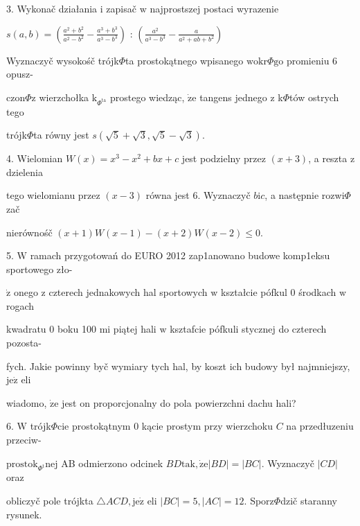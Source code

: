 \documentclass[a4paper,12pt]{article}
\begin{document}
3. Wykonač działania $\mathrm{i}$ zapisač $\mathrm{w}$ najprostszej postaci wyrazenie

$s(a,b)= (\displaystyle \frac{a^{2}+b^{2}}{a^{2}-b^{2}}-\frac{a^{3}+b^{3}}{a^{3}-b^{3}})$ : $(\displaystyle \frac{a^{2}}{a^{3}-b^{3}}-\frac{a}{a^{2}+ab+b^{2}})$

Wyznaczyč wysokośč trójk$\Phi$ta prostokątnego wpisanego $\mathrm{w}\mathrm{o}\mathrm{k}\mathrm{r}\Phi \mathrm{g}\mathrm{o}$ promieniu 6 opusz-

$\mathrm{c}\mathrm{z}\mathrm{o}\mathrm{n}\Phi \mathrm{z}$ wierzchołka $\mathrm{k}_{\Phi^{\mathrm{t}\mathrm{a}}}$ prostego wiedząc, $\dot{\mathrm{z}}\mathrm{e}$ tangens jednego $\mathrm{z}$ k$\Phi$tów ostrych tego

trójk$\Phi$ta równy jest $s(\sqrt{5}+\sqrt{3},\sqrt{5}-\sqrt{3}).$

4. Wielomian $W(x) =x^{3}-x^{2}+bx+c$ jest podzielny przez $(x+3)$, a reszta $\mathrm{z}$ dzielenia

tego wielomianu przez $(x-3)$ równa jest 6. Wyznaczyč $b\mathrm{i} c$, a następnie rozwi$\Phi$zač

nierównośč $(x+1)W(x-1)-(x+2)W(x-2)\leq 0.$

5. $\mathrm{W}$ ramach przygotowań do EURO 2012 zap1anowano budowe komp1eksu sportowego zło-

$\dot{\mathrm{z}}$ onego $\mathrm{z}$ czterech jednakowych hal sportowych $\mathrm{w}$ kształcie pófkul $0$ środkach $\mathrm{w}$ rogach

kwadratu $0$ boku 100 $\mathrm{m}\mathrm{i}$ piątej hali $\mathrm{w}$ ksztafcie pófkuli stycznej do czterech pozosta-

fych. Jakie powinny byč wymiary tych hal, by koszt ich budowy był najmniejszy, $\mathrm{j}\mathrm{e}\dot{\mathrm{z}}$ eli

wiadomo, $\dot{\mathrm{z}}\mathrm{e}$ jest on proporcjonalny do pola powierzchni dachu hali?

6. $\mathrm{W}$ trójk$\Phi$cie prostokątnym $0$ kącie prostym przy wierzchoku $C$ na przedłuzeniu przeciw-

$\mathrm{p}\mathrm{r}\mathrm{o}\mathrm{s}\mathrm{t}\mathrm{o}\mathrm{k}_{\Phi^{\mathrm{t}}}\mathrm{n}\mathrm{e}\mathrm{j}$ AB odmierzono odcinek $BD\mathrm{t}\mathrm{a}\mathrm{k}, \dot{\mathrm{z}}\mathrm{e}|BD|=|BC|$. Wyznaczyč $|CD|$ oraz

obliczyč pole trójkta $\triangle ACD, \mathrm{j}\mathrm{e}\dot{\mathrm{z}}$ eli $|BC|=5, |AC|=12$. Sporz$\Phi$dzič staranny rysunek.
\end{document}
